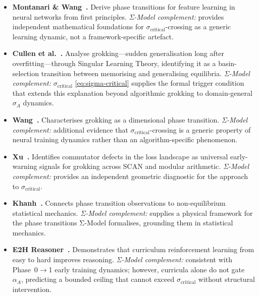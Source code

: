 \begin{itemize}[nosep]
\item \textbf{Montanari \& Wang~\cite{montanari2026}.} Derive phase transitions for feature learning in neural networks from first principles. \emph{Σ-Model complement:} provides independent mathematical foundations for $\sigma_{\text{critical}}$-crossing as a generic learning dynamic, not a framework-specific artefact.

\item \textbf{Cullen et al.~\cite{cullen2026basinselectiongrokking}.} Analyse grokking---sudden generalisation long after overfitting---through Singular Learning Theory, identifying it as a basin-selection transition between memorising and generalising equilibria. \emph{Σ-Model complement:} $\sigma_{\text{critical}}$ \eqref{eq:sigma-critical} supplies the formal trigger condition that extends this explanation beyond algorithmic grokking to domain-general $\sigma_A$ dynamics.

\item \textbf{Wang~\cite{wang2026grokkingdimensionalphase}.} Characterises grokking as a dimensional phase transition. \emph{Σ-Model complement:} additional evidence that $\sigma_{\text{critical}}$-crossing is a generic property of neural training dynamics rather than an algorithm-specific phenomenon.

\item \textbf{Xu~\cite{xu2026earlywarning}.} Identifies commutator defects in the loss landscape as universal early-warning signals for grokking across SCAN and modular arithmetic. \emph{Σ-Model complement:} provides an independent geometric diagnostic for the approach to $\sigma_{\text{critical}}$.

\item \textbf{Khanh~\cite{khanh2026phasetransitionsdriven}.} Connects phase transition observations to non-equilibrium statistical mechanics. \emph{Σ-Model complement:} supplies a physical framework for the phase transitions Σ-Model formalises, grounding them in statistical mechanics.

\item \textbf{E2H Reasoner~\cite{e2h2025}.} Demonstrates that curriculum reinforcement learning from easy to hard improves reasoning. \emph{Σ-Model complement:} consistent with Phase~0$\to$1 early training dynamics; however, curricula alone do not gate $\alpha_A$, predicting a bounded ceiling that cannot exceed $\sigma_{\text{critical}}$ without structural intervention.
\end{itemize}

